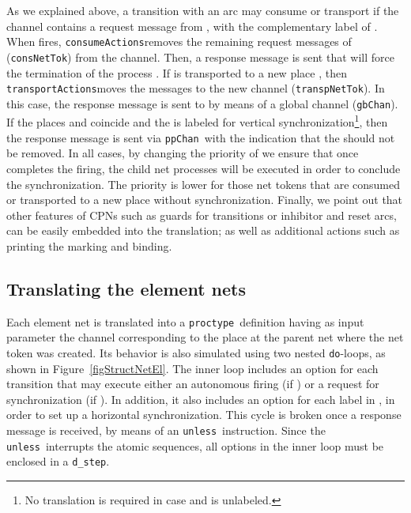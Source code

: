 \documentclass{llncs}
\begin{document}
As we explained above, a transition  with an arc  may consume or transport  if the channel contains a request message from , with the complementary label of .  When  fires, \small\verb"consumeActions"\nfont removes the remaining request messages of  (\small\verb"consNetTok"\nfont) from the channel. Then, a response message is sent that will force the termination of the process . If  is transported to a new place , then \small\verb"transportActions"\nfont moves the messages to the new channel (\small\verb"transpNetTok"\nfont). In this case, the response message is sent to  by means of a global channel (\small\verb"gbChan"\nfont). If the places  and  coincide and the  is labeled for vertical synchronization\footnote{No translation is required in case  and  is unlabeled.}, then the response message is sent via \small\verb"ppChan"\nfont\  with the indication that the  should not be removed.  In all cases, by changing the priority of  we ensure that once  completes the firing, the child net processes will be executed in order to conclude the synchronization. The priority is lower for those net tokens that are consumed or transported to a new place without synchronization. Finally, we point out that other features of CPNs such as guards for transitions or inhibitor and reset arcs, can be easily embedded into the translation; as well as additional actions such as printing the marking and binding.


\subsection{Translating the element nets}

Each element net is translated into a \small\verb"proctype"\nfont\ definition having as input parameter the channel corresponding to the place at the parent net where the net token was created. Its behavior is also simulated using two nested \small\verb"do"\nfont-loops, as shown in Figure~\ref{figStructNetEl}. The inner loop includes an option for each transition  that may execute either an autonomous firing (if ) or a request for synchronization (if ). In addition, it also includes an option for each label in , in order to set up a horizontal synchronization. This cycle is broken  once a response message is received, by means of an \small\verb"unless"\nfont\  instruction. Since the \small\verb"unless"\nfont\  interrupts the atomic sequences, all options in the inner loop must be enclosed in a \small\verb"d_step"\nfont.
\end{document}
